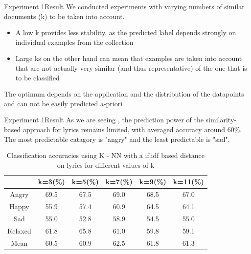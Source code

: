 \documentclass{beamer}
\begin{document}
\begin{frame}{Experiment 1}{Result}
We conducted experiments with varying numbers of similar documents (k) to be taken into account.
  \begin{itemize}
  \item {
    A low k provides less stability, as the predicted label depends strongly on individual examples from the collection
  }
  \item 
  {
  	Large ks on the other hand can mean that examples are taken into account that are not actually very similar (and thus representative) of the one that is to be classified
    
  }
  \end{itemize}
  The optimum depends on the application and the distribution of the datapoints and can not be easily predicted a-priori
  
\end{frame}


\begin{frame}{Experiment 1}{Result}
{\small As we are seeing , the prediction power of the similarity-based approach for lyrics remains limited, with averaged accuracy around 60\%. The most predictable catagory is "angry" and the least predictable is "sad".  }
	\begin{table}[tbh]
		\centering
		
		\begin{tabular}{|c|c|c|c|c|c|}
		\hline
		        & k=3(\%) & k=5(\%) & k=7(\%) & k=9(\%) & k=11(\%) \\ \hline
		  Angry & 69.5 & 67.5 & 69.0 & 68.5 & 67.0 \\ %
		  Happy & 55.9 & 57.4 & 60.9 & 64.5 & 64.1\\ %
		  Sad & 55.0 & 52.8 & 58.9 & 54.5 & 55.0\\ %
		  Relaxed & 61.8 & 65.8 & 61.0 & 59.8 & 59.1 \\ \hline
		  Mean & 60.5 & 60.9 & 62.5 & 61.8 & 61.3 \\ \hline
		  
		  
		   
		
		
		\end{tabular}
		\caption{Classification accuracies using K - NN with a if.idf based distance on lyrics for different values of k}
	\end{table}  
\end{frame}
\end{document}
